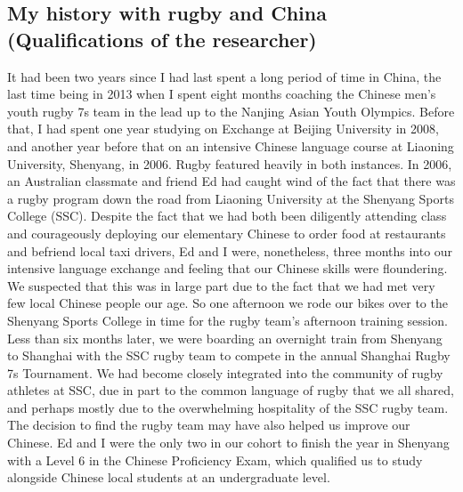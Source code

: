 \subsection{My history with rugby and China (Qualifications of the researcher)}
It had been two years since I had last spent a long period of time in China, the last time being in 2013 when I spent eight months coaching the Chinese men's youth rugby 7s team in the lead up to the Nanjing Asian Youth Olympics.  Before that, I had spent one year studying on Exchange at Beijing University in 2008, and another year before that on an intensive Chinese language course at Liaoning University, Shenyang, in 2006.  Rugby featured heavily in both instances.  In 2006, an Australian classmate and friend Ed had caught wind of the fact that there was a rugby program down the road from Liaoning University at the Shenyang Sports College (SSC).  Despite the fact that we had both been diligently attending class and courageously deploying our elementary Chinese to order food at restaurants and befriend local taxi drivers, Ed and I were, nonetheless, three months into our intensive language exchange and feeling that our Chinese skills were floundering.  We suspected that this was in large part due to the fact that we had met very few local Chinese people our age.  So one afternoon we rode our bikes over to the Shenyang Sports College in time for the rugby team's afternoon training session.  Less than six months later, we were boarding an overnight train from Shenyang to Shanghai with the SSC rugby team to compete in the annual Shanghai Rugby 7s Tournament.  We had become closely integrated into the community of rugby athletes at SSC, due in part to the common language of rugby that we all shared, and perhaps mostly due to the overwhelming hospitality of the SSC rugby team.  The decision to find the rugby team may have also helped us improve our Chinese. Ed and I were the only two in our cohort to finish the year in Shenyang with a Level 6 in the Chinese Proficiency Exam, which qualified us to study alongside Chinese local students at an undergraduate level.

